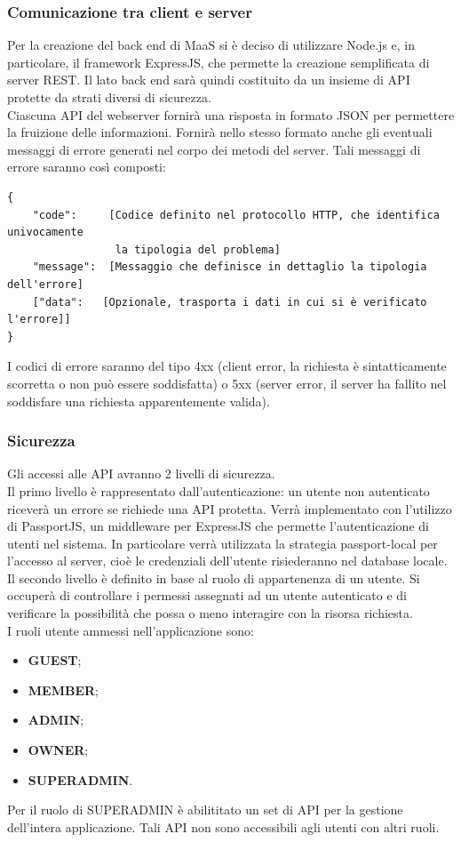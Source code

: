 \subsubsection{Comunicazione tra client e server}
Per la creazione del back end di MaaS si è deciso di utilizzare Node.js e, in particolare, il framework ExpressJS, che permette la creazione semplificata di server REST. Il lato back end sarà quindi costituito da un insieme di API protette da strati diversi di sicurezza. \\
Ciascuna API del webserver fornirà una risposta in formato JSON per permettere la fruizione delle informazioni. Fornirà nello stesso formato anche gli eventuali messaggi di errore generati nel corpo dei metodi del server. Tali messaggi di errore saranno così composti: 
\begin{verbatim}
{
    "code":     [Codice definito nel protocollo HTTP, che identifica univocamente
                 la tipologia del problema]
    "message":  [Messaggio che definisce in dettaglio la tipologia dell'errore]
    ["data":   [Opzionale, trasporta i dati in cui si è verificato l'errore]]
}
\end{verbatim}
I codici di errore saranno del tipo 4xx (client error, la richiesta è sintatticamente scorretta o non può essere soddisfatta) o 5xx (server error, il server ha fallito nel soddisfare una richiesta apparentemente valida).
\subsubsection{Sicurezza}
Gli accessi alle API avranno 2 livelli di sicurezza. \\
Il primo livello è rappresentato dall'autenticazione: un utente non autenticato riceverà un errore se richiede una API protetta. Verrà implementato con l'utilizzo di PassportJS, un middleware per ExpressJS che permette l'autenticazione di utenti nel sistema. In particolare verrà utilizzata la strategia passport-local per l'accesso al server, cioè le credenziali dell'utente risiederanno nel database locale. \\
Il secondo livello è definito in base al ruolo di appartenenza di un utente. Si occuperà di controllare i permessi assegnati ad un utente autenticato e di verificare la possibilità che possa o meno interagire con la risorsa richiesta. \\
I ruoli utente ammessi nell'applicazione sono: 
\begin{itemize}
\item \textbf{GUEST};
\item \textbf{MEMBER};
\item \textbf{ADMIN};
\item \textbf{OWNER};
\item \textbf{SUPERADMIN}.
\end{itemize}
Per il ruolo di SUPERADMIN è abilititato un set di API per la gestione dell'intera applicazione. Tali API non sono accessibili agli utenti con altri ruoli.
